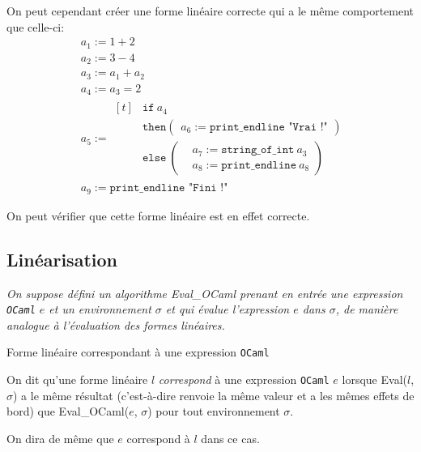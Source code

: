 \begin{example}
    On peut cependant créer une forme linéaire correcte qui a le même
    comportement que celle-ci:
    \begin{align*}
         & a_1 := 1 + 2                            \\
         & a_2 := 3 - 4                            \\
         & a_3 := a_1 + a_2                        \\
         & a_4 := a_3 = 2                          \\
         & a_5 :=
        \begin{aligned}[t]
             & \texttt{if}\ a_4      \\
             & \texttt{then} \left(
            \begin{aligned}
                    a_6 := \texttt{print\_endline "Vrai !"}
                \end{aligned}
            \right)\                 \\
             & \texttt{else}\ \left(
            \begin{aligned}
                     & a_7 := \texttt{string\_of\_int}\ a_3 \\
                     & a_8 := \texttt{print\_endline}\ a_8
                \end{aligned}
            \right)
        \end{aligned}                  \\
         & a_9 := \texttt{print\_endline "Fini !"}
    \end{align*}

    On peut vérifier que cette forme linéaire est en effet correcte.
\end{example}

\subsection{Linéarisation}

\textit{
    On suppose défini un algorithme \textnormal{Eval\_OCaml} prenant en
    entrée une expression \texttt{OCaml} $e$ et un environnement $\sigma$ et qui
    évalue l'expression $e$ dans $\sigma$, de manière analogue à l'évaluation
    des formes linéaires.
}

\begin{definition}
    \label{definition_correspondance}
    Forme linéaire correspondant à une expression \texttt{OCaml}

    On dit qu'une forme linéaire $l$ \textit{correspond} à une expression
    \texttt{OCaml} $e$ lorsque Eval($l$, $\sigma$) a le même résultat
    (c'est-à-dire renvoie la même valeur et a les mêmes effets de bord)
    que Eval\_OCaml($e$, $\sigma$) pour tout environnement $\sigma$.

    On dira de même que $e$ correspond à $l$ dans ce cas.
\end{definition}

